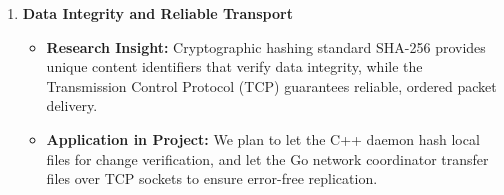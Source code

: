 \begin{enumerate}
    \item \textbf{Data Integrity and Reliable Transport}
    \begin{itemize}
        \item \textbf{Research Insight:} Cryptographic hashing standard SHA-256 \cite{fips1804} provides unique content identifiers that verify data integrity, while the Transmission Control Protocol (TCP) \cite{rfc9293} guarantees reliable, ordered packet delivery.
        \item \textbf{Application in Project:} We plan to let the C++ daemon hash local files for change verification, and let the Go network coordinator transfer files over TCP sockets to ensure error-free replication.
    \end{itemize}
\end{enumerate}
